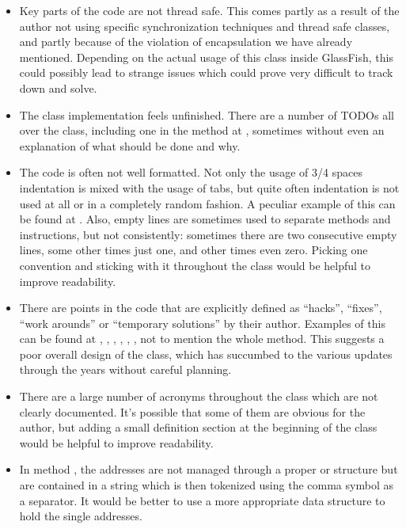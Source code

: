 \begin{itemize}
	 \item Key parts of the code are not thread safe. This comes partly as a result of the author not using specific synchronization techniques and thread safe classes, and partly because of the violation of encapsulation we have already mentioned. Depending on the actual usage of this class inside GlassFish, this could possibly lead to strange issues which could prove very difficult to track down and solve. 
	 \item The class implementation feels unfinished. There are a number of TODOs all over the class, including one in the  method at , sometimes without even an explanation of what should be done and why. 
	 \item The code is often not well formatted. Not only the usage of 3/4 spaces indentation is mixed with the usage of tabs, but quite often indentation is not used at all or in a completely random fashion. A peculiar example of this can be found at . Also, empty lines are sometimes used to separate methods and instructions, but not consistently: sometimes there are two consecutive empty lines, some other times just one, and other times even zero. Picking one convention and sticking with it throughout the class would be helpful to improve readability.
	 \item There are points in the code that are explicitly defined as “hacks”, “fixes”, “work arounds” or “temporary solutions” by their author. Examples of this can be found at , , , , , , not to mention the whole  method. This suggests a poor overall design of the class, which has succumbed to the various updates through the years without careful planning. 
	 \item There are a large number of acronyms throughout the class which are not clearly documented. It's possible that some of them are obvious for the author, but adding a small definition section at the beginning of the class would be helpful to improve readability.
	 \item In method , the addresses are not managed through a proper  or  structure but are contained in a string which is then tokenized using the comma symbol as a separator. It would be better to use a more appropriate data structure to hold the single addresses. 
\end{itemize}
	 
